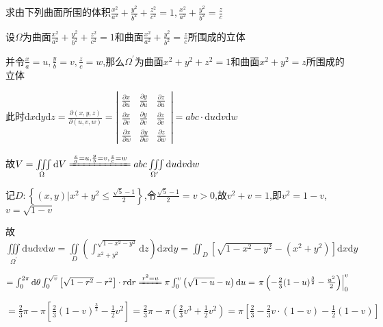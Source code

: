 \begin{xiti}
	\item 	求由下列曲面所围的体积$
	\frac{x^{2}}{a^{2}}+\frac{y^{2}}{b^{2}}+\frac{z^{2}}{c^{2}}=1, \frac{x^{2}}{a^{2}}+\frac{y^{2}}{b^{2}}=\frac{z}{c}$
	\begin{solution}
		设$\Omega$为曲面$\frac{x^{2}}{a^{2}}+\frac{y^{2}}{b^{2}}+\frac{z^{2}}{c^{2}}=1$和曲面$\frac{x^{2}}{a^{2}}+\frac{y^{2}}{b^{2}}=\frac{z}{c}$所围成的立体
		
		并令$\frac{x}{a}=u,\frac{y}{b}=v,\frac{z}{c}=w$,那么${\Omega}^{\prime}$为曲面$x^{2}+y^{2}+z^{2}=1$和曲面$x^{2}+y^{2}=z$所围成的立体
		
		此时$\mathrm{d} x \mathrm{d} y \mathrm{d} z =\frac{\partial(x,y,z)}{\partial(u,v,w)} = \left| \begin{array} {lll} {\frac{\partial x}{\partial u}} & {\frac{\partial y}{\partial u}} & {\frac{\partial z}{\partial u}} \\ {\frac{\partial x}{\partial v}} & {\frac{\partial y}{\partial v}} & {\frac{\partial z}{\partial v}} \\ {\frac{\partial x}{\partial w}} & {\frac{\partial y}{\partial w}} & {\frac{\partial z}{\partial w}} \end{array} \right| = abc\cdot \mathrm{d} u \mathrm{d} v \mathrm{d} w$
		
		故$V=\iiint\limits_{\Omega} \mathrm{d} V \xlongequal{\frac{x}{a}=u,\frac{y}{b}=v,\frac{z}{c}=w} abc \iiint\limits_{{\Omega}^{\prime}} \mathrm{d} u \mathrm{d} v \mathrm{d} w $
		
		记$D : \left\{(x,y)| x^{2} +y^{2} \leqslant \frac{\sqrt 5 - 1}{2} \right\}$,令$\frac{\sqrt{5}-1}{2}=v>0$,故$v^{2}+v=1$,即$v^{2}=1-v$,$v=\sqrt{1-v}$
		
		故$\iiint\limits_{{\Omega}^{\prime}} \mathrm{d} u \mathrm{d} v \mathrm{d} w = \iint\limits_{D} \left( \int_{x^{2}+y^{2}}^{\sqrt {1-x^{2}-y^{2}}} \mathrm{d} z \right) \mathrm{d} x \mathrm{d} y = \iint_{D} \left[ \sqrt{1-x^{2}-y^{2}}-(x^{2}+y^{2}) \right] \mathrm{d} x \mathrm{d} y$
		
		$= \int_{0}^{2\pi} \mathrm{d} \theta \int_{0}^{\sqrt{v}} \left[ \sqrt{1-r^{2}} - r^{2} \right] \cdot r \mathrm{d} r \xlongequal{r^{2}=u} \pi \int_{0}^{v} \left( \sqrt{1-u} - u \right) \mathrm{d} u = \left. \pi \left( -\frac{2}{3}(1-u)^{\frac{3}{2}} - \frac{u^{2}}{2} \right) \right|_{0} ^{v} $
		
		$=\frac{2}{3} \pi - \pi \left[ \frac{2}{3} \left( 1-  v \right) ^{\frac{3}{2}} - \frac{1}{2} v^{2} \right] = \frac{2}{3} \pi - \pi \left( \frac{2}{3} v^{3} + \frac{1}{2} v^{2} \right) = \pi \left[\frac{2}{3} - \frac{2}{3} v \cdot (1-v) - \frac{1}{2} (1-v) \right] $
		

\end{solution}
\end{xiti}
